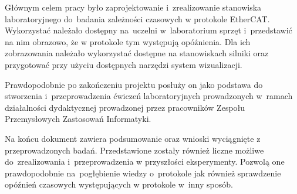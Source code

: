 Głównym celem pracy było zaprojektowanie i~zrealizowanie stanowiska laboratoryjnego do~badania zależności czasowych w protokole EtherCAT. Wykorzystać należało dostępny na~uczelni w~laboratorium sprzęt i~przedstawić na nim obrazowo, że w protokole tym występują opóźnienia. Dla ich zobrazowania należało wykorzystać dostępne na stanowiskach silniki oraz przygotować przy użyciu dostępnych narzędzi system wizualizacji.

Prawdopodobnie po zakończeniu projektu posłuży on jako podstawa do stworzenia i~przeprowadzenia ćwiczeń laboratoryjnych prowadzonych w~ramach działalności dydaktycznej prowadzonej przez pracowników Zespołu Przemysłowych Zastosowań Informatyki.
%
%

Na końcu dokument zawiera podsumowanie oraz wnioski wyciągnięte z przeprowadzonych badań. Przedstawione zostały również liczne możliwe do~zrealizowania i~przeprowadzenia w przyszłości eksperymenty. Pozwolą one prawdopodobnie na~pogłębienie wiedzy o~protokole jak również sprawdzenie opóźnień czasowych występujących w protokole w~inny sposób.
\clearpage